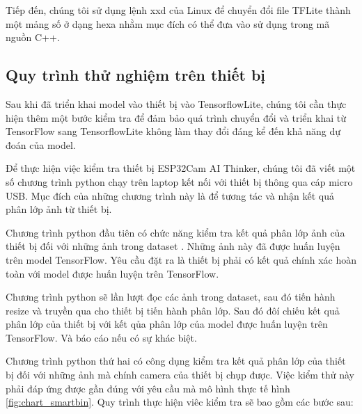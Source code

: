 Tiếp đến, chúng tôi sử dụng lệnh xxd của Linux để chuyển đổi file TFLite thành một mảng số ở dạng hexa nhằm mục đích có thể đưa vào sử dụng trong mã nguồn C++.  

\subsection{Quy trình thử nghiệm trên thiết bị}


Sau khi đã triển khai model vào thiết bị vào TensorflowLite, chúng tôi cần thực hiện thêm một bước kiểm tra để đảm bảo quá trình chuyển đổi và triển khai từ TensorFlow sang TensorflowLite không làm thay đổi đáng kể đến khả năng dự đoán của model.

Để thực hiện việc kiểm tra thiết bị ESP32Cam AI Thinker, chúng tôi đã viết một số chương trình python chạy trên laptop kết nối với thiết bị thông qua cáp micro USB. Mục đích của những chương trình này là để tương tác và nhận kết quả phân lớp ảnh từ thiết bị.

Chương trình python đầu tiên có chức năng kiểm tra kết quả phân lớp ảnh của thiết bị đối với những ảnh trong dataset \cite{trashnet}. Những ảnh này đã được huấn luyện trên model TensorFlow. Yêu cầu đặt ra là thiết bị phải có kết quả chính xác hoàn toàn với model được huấn luyện trên TensorFlow.

Chương trình python sẽ lần lượt đọc các ảnh trong dataset, sau đó tiến hành resize và truyền qua cho thiết bị tiến hành phân lớp. Sau đó đôí chiếu kết quả phân lớp của thiết bị với kết qủa phân lớp của model được huấn luyện trên TensorFlow. Và báo cáo nếu có sự khác biệt.

Chương trình python thứ hai có công dụng kiểm tra kết quả phân lớp của thiết bị đối với những ảnh mà chính camera của thiết bị chụp được. Việc kiểm thử này phải đáp ứng được gần đúng với yêu cầu mà mô hình thực tế hình \ref{fig:chart_smartbin}. Quy trình thực hiện viêc kiểm tra sẽ bao gồm các bước sau:


